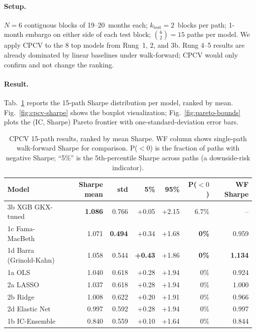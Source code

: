 \documentclass[11pt]{article}
\begin{document}
\paragraph{Setup.}
$N{=}6$ contiguous blocks of 19--20~months each;
$k_{\text{test}}{=}2$~blocks per path; 1-month embargo on either side
of each test block; $\binom{6}{2}{=}15$ paths per model. We apply CPCV
to the 8 top models from Rung~1, 2, and 3b. Rung 4--5 results are
already dominated by linear baselines under walk-forward; CPCV would
only confirm and not change the ranking.

\paragraph{Result.}
Tab.~\ref{tab:cpcv} reports the 15-path Sharpe distribution per model,
ranked by mean. Fig.~\ref{fig:cpcv-sharpe} shows the boxplot
visualization; Fig.~\ref{fig:pareto-bounds} plots the (IC, Sharpe)
Pareto frontier with one-standard-deviation error bars.

\begin{table}[t]
\centering
\caption{CPCV 15-path results, ranked by mean Sharpe. WF column shows
single-path walk-forward Sharpe for comparison. P($<0$) is the fraction
of paths with negative Sharpe; ``5\%'' is the 5th-percentile Sharpe
across paths (a downside-risk indicator).}
\label{tab:cpcv}
\small
\begin{tabular}{l r r r r r r}
\toprule
Model & Sharpe mean & std & 5\% & 95\% & P($<0$) & WF Sharpe \\
\midrule
3b XGB GKX-tuned       & \textbf{1.086} & 0.766 & +0.05 & +2.15 & 6.7\% & --   \\
1c Fama-MacBeth        & 1.071 & \textbf{0.494} & +0.34 & +1.68 & \textbf{0\%} & 0.959 \\
1d Barra (Grinold-Kahn) & 1.058 & 0.544 & \textbf{+0.43} & +1.86 & \textbf{0\%} & \textbf{1.134} \\
1a OLS                 & 1.040 & 0.618 & +0.28 & +1.94 & 0\%   & 0.924 \\
2a LASSO               & 1.037 & 0.618 & +0.28 & +1.94 & 0\%   & 1.000 \\
2b Ridge               & 1.008 & 0.622 & +0.20 & +1.91 & 0\%   & 0.966 \\
2d Elastic Net         & 0.997 & 0.592 & +0.28 & +1.94 & 0\%   & 0.997 \\
1b IC-Ensemble         & 0.840 & 0.559 & +0.10 & +1.64 & 0\%   & 0.844 \\
\bottomrule
\end{tabular}
\end{table}
\end{document}
